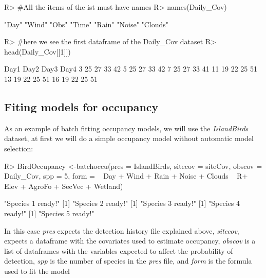 \documentclass[article]{jss}
\begin{document}
\begin{CodeChunk}

\begin{CodeInput}
R> #All the items of the ist must have names
R> names(Daily_Cov)
\end{CodeInput}

\begin{CodeOutput}
[1] "Day"    "Wind"   "Obs"    "Time"   "Rain"   "Noise"  "Clouds"
\end{CodeOutput}

\begin{CodeInput}
R> #here we see the first dataframe of the Daily_Cov dataset
R> head(Daily_Cov[[1]])
\end{CodeInput}

\begin{CodeOutput}
   Day1 Day2 Day3 Day4
3    25   27   33   42
5    25   27   33   42
7    25   27   33   41
11   19   22   25   51
13   19   22   25   51
16   19   22   25   51
\end{CodeOutput}
\end{CodeChunk}

\subsection{Fiting models for
occupancy}\label{fiting-models-for-occupancy}

As an example of batch fitting occupancy models, we will use the
\emph{IslandBirds} dataset, at first we will do a simple occupancy model
without automatic model selection:

\begin{CodeChunk}

\begin{CodeInput}
R> BirdOccupancy <-batchoccu(pres = IslandBirds, sitecov = siteCov, obscov = Daily_Cov, spp =  5, form = ~ Day + Wind + Rain + Noise + Clouds ~
R+ Elev + AgroFo + SecVec + Wetland)
\end{CodeInput}

\begin{CodeOutput}
[1] "Species 1 ready!"
[1] "Species 2 ready!"
[1] "Species 3 ready!"
[1] "Species 4 ready!"
[1] "Species 5 ready!"
\end{CodeOutput}
\end{CodeChunk}

In this case \emph{pres} expects the detection history file explained
above, \emph{sitecov}, expects a dataframe with the covariates used to
estimate occupancy, \emph{obscov} is a list of dataframes with the
variables expected to affect the probability of detection, \emph{spp} is
the number of species in the \emph{pres} file, and \emph{form} is the
formula used to fit the model
\end{document}

